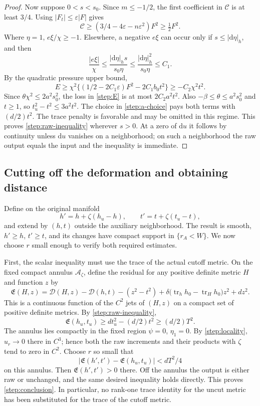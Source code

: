 \documentclass[11pt]{article}
\numberwithin{equation}{section}
\theoremstyle{definition}
\theoremstyle{remark}
\begin{document}
\begin{proof}
Now suppose $0<s<s_0$.  Since $m\le-1/2$, the first coefficient in
$\mathcal C$ is at least $3/4$.  Using $|F_t|\le\varepsilon|F|$ gives
\[
 \mathcal C\ge(3/4-4\varepsilon-n\varepsilon^2)F^2\ge\tfrac12F^2.
\]
Where $\eta=1$, $e\xi/\chi\ge-1$.  Elsewhere, a negative $e\xi$
can occur only if $s\le|\mathrm d\eta|_h$, and then
\[
 \frac{|e\xi|}{\chi}
 \le\frac{|\mathrm d\eta|_h s}{s_0\eta}
 \le\frac{|\mathrm d\eta|_h^2}{s_0\eta}\le C_1.
\]
By the quadratic pressure upper bound,
\begin{equation}\label{step:small-slope}
 E\ge\chi^2\{(1/2-2C_1\varepsilon)F^2-2C_1b_0t^2\}
 \ge-C_2\chi^2t^2.
\end{equation}
Since $\theta\chi^2\le2a^2s_0^2$, the loss in \cref{step:E} is
at most $2C_2a^2t^2$.  Also $-\beta\le\theta\le a^2s_0^2$ and
$t\ge1$, so $t_u^2-t^2\le3a^2t^2$.  The choice in
\cref{step:a-choice} pays both terms with $(d/2)t^2$.
The trace penalty is favorable and may be omitted in this regime.
This proves \cref{step:raw-inequality} wherever $s>0$.
At a zero of $\mathrm d u$ it follows by continuity unless $\mathrm d u$ vanishes
on a neighborhood; on such a neighborhood the raw output equals the
input and the inequality is immediate.
\end{proof}

\subsection{Cutting off the deformation and obtaining distance}

Define on the original manifold
\begin{equation}\label{step:final-output}
 h'=h+\zeta(h_u-h),\qquad t'=t+\zeta(t_u-t),
\end{equation}
and extend by $(h,t)$ outside the auxiliary neighborhood.  The result
is smooth, $h'\ge h$, $t'\ge t$, and its changes have compact support
in $\{r_A<W\}$.  We now choose $r$ small enough to verify both
required estimates.

First, the scalar inequality must use the trace of the actual cutoff
metric.  On the fixed compact annulus $\mathcal A_\zeta$, define the residual for any positive definite metric $H$
and function $z$ by
\[
 \mathfrak E(H,z)=\mathcal D(H,z)-\mathcal D(h,t)-(z^2-t^2)
 +\delta\bigl(\operatorname{tr}_hh_0-\operatorname{tr}_Hh_0\bigr)z^2+dz^2.
\]
This is a continuous function of the $C^2$ jets of $(H,z)$ on a compact
set of positive definite metrics.  By \cref{step:raw-inequality},
\[
 \mathfrak E(h_u,t_u)\ge dt_u^2-(d/2)t^2\ge(d/2)T^2.
\]
The annulus lies compactly in the fixed region $\psi=0$, $\eta_1=0$.
By \cref{step:locality}, $u_r\to0$ there in $C^3$; hence both the raw
increments and their products with $\zeta$ tend to zero in $C^2$.
Choose $r$ so small that
\[
 |\mathfrak E(h',t')-\mathfrak E(h_u,t_u)|<dT^2/4
\]
on this annulus.  Then $\mathfrak E(h',t')>0$ there.  Off the annulus
the output is either raw or unchanged, and the same desired inequality
holds directly.  This proves \cref{step:conclusion}.  In particular,
no rank-one trace identity for the uncut metric has been substituted
for the trace of the cutoff metric.
\end{document}
